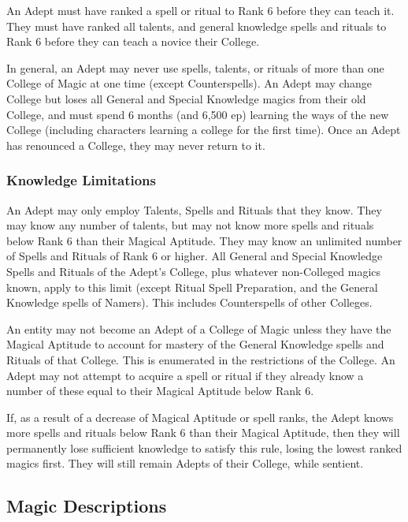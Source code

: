 \begin{multicols*}{3}
An Adept must have ranked a spell or ritual to Rank 6 before they can
teach it. They must have ranked all talents, and general knowledge
spells and rituals to Rank 6 before they can teach a novice their
College.

In general, an Adept may never use spells, talents, or rituals of more
than one College of Magic at one time (except Counterspells). An Adept
may change College but loses all General and Special Knowledge magics
from their old College, and must spend 6 months (and 6,500 ep) learning
the ways of the new College (including characters learning a college
for the first time).  Once an Adept has renounced a College, they may
never return to it.

\subsubsection{Knowledge Limitations}

An Adept may only employ Talents, Spells and Rituals that they
know. They may know any number of talents, but may not know more
spells and rituals below Rank 6 than their Magical Aptitude. They may
know an unlimited number of Spells and Rituals of Rank 6 or
higher. All General and Special Knowledge Spells and Rituals of the
Adept's College, plus whatever non-Colleged magics known, apply to
this limit (except Ritual Spell Preparation, and the General Knowledge
spells of Namers). This includes Counterspells of other Colleges.

An entity may not become an Adept of a College of Magic unless they
have the Magical Aptitude to account for mastery of the General
Knowledge spells and Rituals of that College. This is enumerated in
the restrictions of the College. An Adept may not attempt to acquire a
spell or ritual if they already know a number of these equal to their
Magical Aptitude below Rank 6.

If, as a result of a decrease of Magical Aptitude or spell ranks, the
Adept knows more spells and rituals below Rank 6 than their Magical
Aptitude, then they will permanently lose sufficient knowledge to
satisfy this rule, losing the lowest ranked magics first. They will
still remain Adepts of their College, while sentient.

\subsection{Magic Descriptions}


\end{multicols*}
